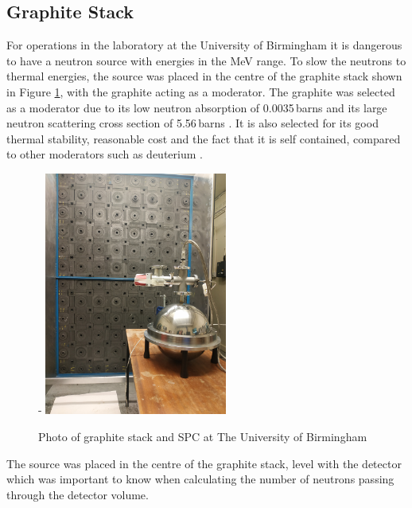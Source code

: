 \documentclass[a4paper]{article}
\begin{document}
\subsection{Graphite Stack}
For operations in the laboratory at the University of Birmingham it is dangerous to have a neutron source with energies in the MeV range. To slow the neutrons to thermal energies, the source was placed in the centre of the graphite stack shown in Figure \ref{fig:stack}, with the graphite acting as a moderator. The graphite was selected as a moderator due to its low neutron absorption of 0.0035\,barns and its large neutron scattering cross section of 5.56\,barns \cite{taylor_francis_1992}. It is also selected for its good thermal stability, reasonable cost and the fact that it is self contained, compared to other moderators such as deuterium \cite{osti_4844185}.
\begin{figure}[H]-
    \centering
    \includegraphics[height=8cm]{stack.jpg}
    \caption{Photo of graphite stack and SPC at The University of Birmingham \cite{ion}}
    \label{fig:stack}
\end{figure}
\noindent The source was placed in the centre of the graphite stack, level with the detector which was  important to know when calculating the number of neutrons passing through the detector volume.
\end{document}
